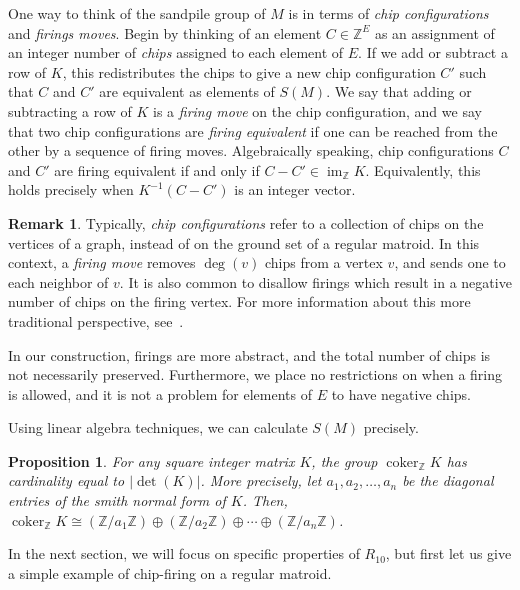 \documentclass[12p]{amsart}
\numberwithin{equation}{section}
\theoremstyle{plain}
\newtheorem{prop}[thm]{Proposition}
\theoremstyle{definition}
\newtheorem{remark}[thm]{Remark}
\newcommand{\Z}{\mathbb {Z}}
\DeclareMathOperator{\im}{im}
\DeclareMathOperator{\coker}{coker}
\begin{document}
One way to think of the sandpile group of $M$ is in terms of \emph{chip configurations} and \emph{firings moves}. Begin by thinking of an element $C \in \Z^E$ as an assignment of an integer number of \emph{chips} assigned to each element of $E$. If we add or subtract a row of $K$, this redistributes the chips to give a new chip configuration $C'$ such that $C$ and $C'$ are equivalent as elements of $S(M)$. We say that adding or subtracting a row of $K$ is a \emph{firing move} on the chip configuration, and we say that two chip configurations are \emph{firing equivalent} if one can be reached from the other by a sequence of firing moves. Algebraically speaking, chip configurations $C$ and $C'$ are firing equivalent if and only if $C - C' \in \im_{\Z} K$. Equivalently, this holds precisely when $K^{-1}(C-C')$ is an integer vector. 

\begin{remark}\label{rem:traditional}
    Typically, \emph{chip configurations} refer to a collection of chips on the vertices of a graph, instead of on the ground set of a regular matroid. In this context, a \emph{firing move} removes $\deg(v)$ chips from a vertex $v$, and sends one to each neighbor of $v$. It is also common to disallow firings which result in a negative number of chips on the firing vertex. For more information about this more traditional perspective, see~\cite{Klivans}. 
    
    In our construction, firings are more abstract, and the total number of chips is not necessarily preserved. Furthermore, we place no restrictions on when a firing is allowed, and it is not a problem for elements of $E$ to have negative chips. 
\end{remark}

Using linear algebra techniques, we can calculate $S(M)$ precisely. 

\begin{prop}\cite[Section 8]{Biggs99}\label{prop:smith_normal}
    For any square integer matrix $K$, the group $\coker_{\Z} K$ has cardinality equal to $|\det(K)|$. More precisely, let $a_1,a_2, \dots, a_n$ be the diagonal entries of the \emph{smith normal form} of $K$. Then, $\coker_{\Z}K \cong (\Z/{a_1}\Z) \oplus (\Z/{a_2}\Z) \oplus \cdots \oplus (\Z/{a_n}\Z)$.
\end{prop} 

In the next section, we will focus on specific properties of $R_{10}$, but first let us give a simple example of chip-firing on a regular matroid. 
\end{document}
